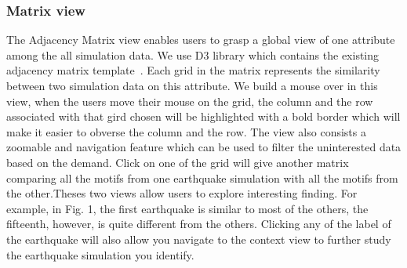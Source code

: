 \subsubsection{Matrix view}
\label{matrixvis}

The Adjacency Matrix view enables users to grasp a global view of one attribute among the all simulation data. We use D3 library which contains the existing adjacency matrix template~\cite{Bostock:2011:DDD:2068462.2068631}. Each grid in the matrix represents the similarity between two simulation data on this attribute.  We build a mouse over in this view, when the users move their mouse on the grid, the column and the row associated with that gird chosen will be highlighted with a bold border which will make it easier to obverse the column and the row. The view also consists a zoomable and navigation feature which can be used to filter the uninterested data based on the demand. Click on one of the grid will give another matrix comparing all the motifs from one earthquake simulation with all the motifs from the other.Theses two views allow users to explore interesting finding. For example, in Fig. 1, the first earthquake is similar to most of the others, the fifteenth, however, is quite different from the others. Clicking any of the label of the earthquake will also allow you navigate to the context view to further study the earthquake simulation you identify.


\

